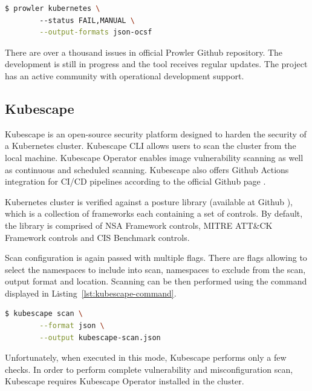 \begin{center}
    \begin{lstlisting}[language=bash, caption={[An example of a Prowler scan command] An example of a Prowler scan command.}, label={lst:prowler-command}]
    $ prowler kubernetes \ 
        --status FAIL,MANUAL \
        --output-formats json-ocsf
    \end{lstlisting}
\end{center}

There are over a thousand issues in official Prowler Github repository. The development is still in progress and the tool receives regular updates. The project has an active community with operational development support.

\subsection{Kubescape}
Kubescape is an open-source security platform designed to harden the security of a Kubernetes cluster. Kubescape CLI allows users to scan the cluster from the local machine. Kubescape Operator enables image vulnerability scanning as well as continuous and scheduled scanning. Kubescape also offers Github Actions integration for CI/CD pipelines according to the official Github page \cite{kubescape-github}.

Kubernetes cluster is verified against a posture library (available at Github \cite{regolibrary-github}), which is a collection of frameworks each containing a set of controls. By default, the library is comprised of NSA Framework controls, MITRE ATT\&CK Framework controls and CIS Benchmark controls.

Scan configuration is again passed with multiple flags. There are flags allowing to select the namespaces to include into scan, namespaces to exclude from the scan, output format and location. Scanning can be then performed using the command displayed in Listing~\ref{lst:kubescape-command}.

\begin{lstlisting}[language=bash, caption={[An example of a Kube-bench scan command] An example of a Kube-bench scan command.}, label={lst:kubescape-command}]
    $ kubescape scan \
        --format json \
        --output kubescape-scan.json
\end{lstlisting}

Unfortunately, when executed in this mode, Kubescape performs only a few checks. In order to perform complete vulnerability and misconfiguration scan, Kubescape requires Kubescape Operator installed in the cluster. 

